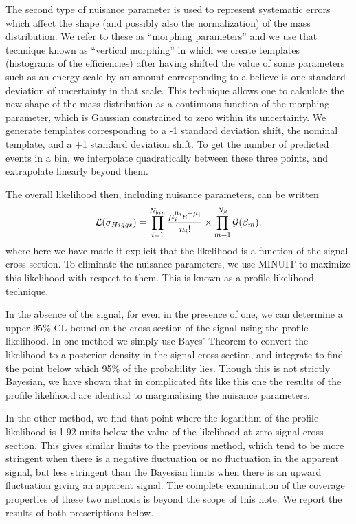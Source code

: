 The second type of nuisance parameter is used to represent systematic
errors which affect the shape (and possibly also the normalization) of
the mass distribution.  We refer to these as ``morphing parameters''
and we use that technique known as ``vertical morphing'' in which we
create templates (histograms of the efficiencies) after having shifted
the value of some parameters such as an energy scale by an amount
corresponding to a believe is one standard deviation of uncertainty in
that scale.  This technique allows one to calculate the new shape of
the mass distribution as a continuous function of the morphing
parameter, which is Gaussian constrained to zero within its
uncertainty.  We generate templates corresponding to a -1 standard
deviation shift, the nominal template, and a +1 standard deviation
shift. To get the number of predicted events in a bin, we interpolate
quadratically between these three points, and extrapolate linearly
beyond them.

The overall likelihood then, including nuisance parameters, can be written
\begin{eqnarray}
  {\cal L}(\sigma_{Higgs}) = \prod_{i=1}^{N_{bin}} \frac{\mu_i^{n_i} e^{-\mu_i}}{n_i!} \times \prod_{m=1}^{N_\beta}{\cal G}(\beta_m).
\end{eqnarray}
where here we have made it explicit that the likelihood is a function
of the signal cross-section.  To eliminate the nuisance parameters, we
use MINUIT to maximize this likelihood with respect to them.  This is
known as a profile likelihood technique.

In the absence of the signal, for even in the presence of one, we can
determine a upper $95\%$ CL bound on the cross-section of the signal using
the profile likelihood.  In one method we simply use Bayes' Theorem to
convert the likelihood to a posterior density in the signal
cross-section, and integrate to find the point below which 95\% of the
probability lies.  Though this is not strictly Bayesian, we have shown
that in complicated fits like this one the results of the profile
likelihood are identical to marginalizing the nuisance parameters.

In the other method, we find that point where the logarithm of the
profile likelihood is 1.92 units below the value of the likelihood at
zero signal cross-section. This gives similar limits to the previous
method, which tend to be more stringent when there is a negative
fluctuation or no fluctuation in the apparent signal, but less
stringent than the Bayesian limits when there is an upward fluctuation
giving an apparent signal.  The complete examination of the coverage
properties of these two methods is beyond the scope of this note. We
report the results of both prescriptions below.


